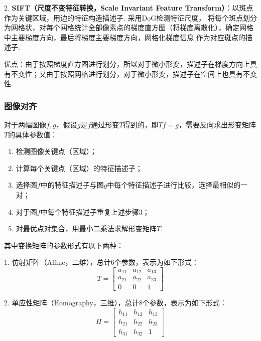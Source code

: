 \documentclass[12pt, a4paper, oneside]{ctexart}
\numberwithin{equation}{section}  %
\theoremstyle{definition}
\begin{document}
2. \textbf{SIFT（尺度不变特征转换，Scale Invariant Feature Transform）}：以斑点作为关键区域，用边的特征构造描述子. 采用DoG检测特征尺度，
将每个斑点划分为网格状，对每个网格统计全部像素点的梯度直方图（将梯度离散化），确定网格中主要梯度方向，最后将梯度主要梯度方向，网格化梯度信息
作为对应斑点的描述子.

优点：由于按照梯度直方图进行划分，所以对于微小形变，描述子在梯度方向上具有不变性；又由于按照网格进行划分，对于微小形变，描述子在空间上也具有不变性.

\subsubsection{图像对齐}\label{sec-图像对齐}
对于两幅图像$f,g$，假设$g$是$f$通过形变$T$得到的，即$Tf = g$，需要反向求出形变矩阵$T$的具体参数值：
\begin{enumerate}
    \item 检测图像关键点（区域）；
    \item 计算每个关键点（区域）的特征描述子；
    \item 选择图$f$中的特征描述子与图$g$中每个特征描述子进行比较，选择最相似的一对；
    \item 对于图$f$中每个特征描述子重复上述步骤$3$；
    \item 对最优点对集合，用最小二乘法求解形变矩阵$T$.
\end{enumerate}
其中变换矩阵的参数形式有以下两种：

1. 仿射矩阵（Affine，二维），总计$6$个参数，表示为如下形式：
\begin{equation*}
    T = \left[\begin{matrix}
    a_{11}&a_{12}&a_{13}\\
    a_{21}&a_{22}&a_{23}\\
    0&0&1
    \end{matrix}
    \right]
\end{equation*}

2. 单应性矩阵（Homography，三维），总计$8$个参数，表示为如下形式：
\begin{equation*}
    H = \left[\begin{matrix}
    h_{11}&h_{12}&h_{13}\\
    h_{21}&h_{22}&h_{23}\\
    h_{31}&h_{32}&1
    \end{matrix}
    \right]
\end{equation*}
\end{document}
